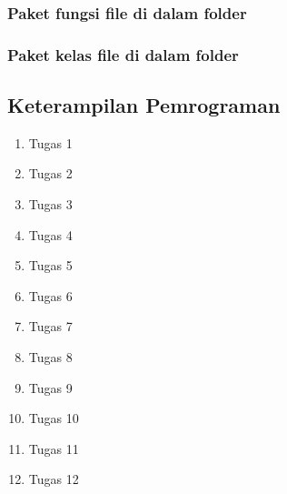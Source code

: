 \subsubsection{Paket fungsi file di dalam folder}

\subsubsection{Paket kelas file di dalam folder}

\subsection{Keterampilan Pemrograman}
\begin{enumerate}
	\item Tugas 1
	
	\begin{figure}
		
		\caption{}
	\end{figure}
	\item Tugas 2
	
	\item Tugas 3
	
	\item Tugas 4
	
	\item Tugas 5
	
	\item Tugas 6
	
	\item Tugas 7
	
	\item Tugas 8
	
	\item Tugas 9
	
	\item Tugas 10
	
	\item Tugas 11
	
	\item Tugas 12
	
\end{enumerate}
